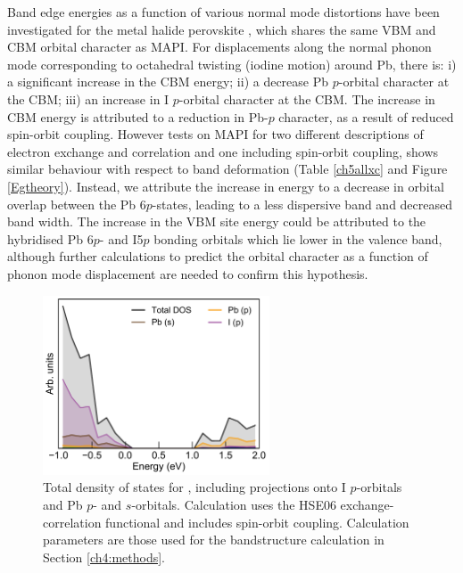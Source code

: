 Band edge energies as a function of various normal mode distortions have been investigated for the metal halide perovskite , which shares the same VBM and CBM orbital character as MAPI.\autocite{McKechnie2018} For displacements along the normal phonon mode corresponding to octahedral twisting (iodine motion) around Pb, there is: i) a significant increase in the CBM energy; ii) a decrease Pb $p$-orbital character at the CBM; iii) an increase in I $p$-orbital character at the CBM. The increase in CBM energy is attributed to a reduction in Pb-$p$ character, as a result of reduced spin-orbit coupling. However tests on MAPI for two different descriptions of electron exchange and correlation and one including spin-orbit coupling, shows similar behaviour with respect to band deformation (Table \ref{ch5allxc} and Figure \ref{Egtheory}). 
Instead, we attribute the increase in energy to a decrease in orbital overlap between the Pb 6$p$-states, leading to a less dispersive band and decreased band width.
The increase in the VBM site energy could be attributed to the hybridised Pb 6$p$- and I5$p$ bonding orbitals which lie lower in the valence band,\autocite{Wang2015i} although further calculations to predict the orbital character as a function of phonon mode displacement are needed to confirm this hypothesis.

\begin{figure}[h] \centering
\includegraphics[width=0.6\textwidth]{figures/ch5/dos.pdf}
\caption[Total and projected density of states]{\label{ch5pdos}
Total density of states for , including projections onto I $p$-orbitals and Pb $p$- and $s$-orbitals. Calculation uses the HSE06 exchange-correlation functional and includes spin-orbit coupling. Calculation parameters are those used for the bandstructure calculation in Section \ref{ch4:methods}.
}
\end{figure}

